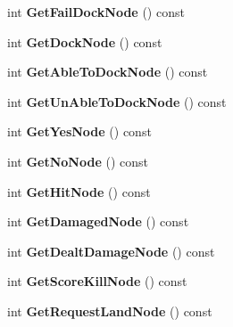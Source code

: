 \begin{DoxyCompactItemize}
\item 
int {\bfseries Get\+Fail\+Dock\+Node} () const \hypertarget{classFSM_a73aa82135d7c337e29c3c6610b4e4fe6}{}\label{classFSM_a73aa82135d7c337e29c3c6610b4e4fe6}

\item 
int {\bfseries Get\+Dock\+Node} () const \hypertarget{classFSM_a21bef925b6ccc4f90015206743868f89}{}\label{classFSM_a21bef925b6ccc4f90015206743868f89}

\item 
int {\bfseries Get\+Able\+To\+Dock\+Node} () const \hypertarget{classFSM_ae7cc500372ae077f481fec372758582e}{}\label{classFSM_ae7cc500372ae077f481fec372758582e}

\item 
int {\bfseries Get\+Un\+Able\+To\+Dock\+Node} () const \hypertarget{classFSM_ade8a8554f8906acd4398d1994f53757f}{}\label{classFSM_ade8a8554f8906acd4398d1994f53757f}

\item 
int {\bfseries Get\+Yes\+Node} () const \hypertarget{classFSM_afc36ea0c689227f08934c29ef83c4aa1}{}\label{classFSM_afc36ea0c689227f08934c29ef83c4aa1}

\item 
int {\bfseries Get\+No\+Node} () const \hypertarget{classFSM_a18167f1a56c1077a63c9ef86f009e9f9}{}\label{classFSM_a18167f1a56c1077a63c9ef86f009e9f9}

\item 
int {\bfseries Get\+Hit\+Node} () const \hypertarget{classFSM_ae458c0d2ef859475e583d561293cc8ce}{}\label{classFSM_ae458c0d2ef859475e583d561293cc8ce}

\item 
int {\bfseries Get\+Damaged\+Node} () const \hypertarget{classFSM_aa0c3c9efc7f14efc0ca856056b3c642b}{}\label{classFSM_aa0c3c9efc7f14efc0ca856056b3c642b}

\item 
int {\bfseries Get\+Dealt\+Damage\+Node} () const \hypertarget{classFSM_a8b78c6bdf064406967c2bdc1bc2f3867}{}\label{classFSM_a8b78c6bdf064406967c2bdc1bc2f3867}

\item 
int {\bfseries Get\+Score\+Kill\+Node} () const \hypertarget{classFSM_ab992c0c3c9ff1cd00145d5c8cd9a5234}{}\label{classFSM_ab992c0c3c9ff1cd00145d5c8cd9a5234}

\item 
int {\bfseries Get\+Request\+Land\+Node} () const \hypertarget{classFSM_a83be690775e2075dedbc3e467a6b0865}{}\label{classFSM_a83be690775e2075dedbc3e467a6b0865}


\end{DoxyCompactItemize}
